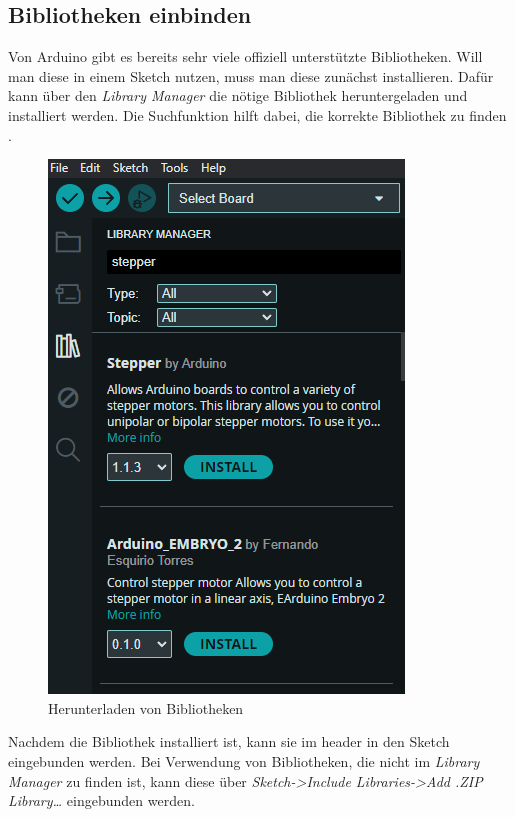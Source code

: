 \subsection{Bibliotheken einbinden}
Von Arduino gibt es bereits sehr viele offiziell unterstützte Bibliotheken. Will man diese in einem Sketch nutzen, muss man diese zunächst installieren.
Dafür kann über den \textit{Library Manager} die nötige Bibliothek heruntergeladen und installiert werden. Die Suchfunktion hilft dabei, die korrekte Bibliothek zu finden \cite{ArdIDE.2024c}.
\begin{figure}
	\begin{center}
		\includegraphics[width=\textwidth]{General/Librarymanager}
		\caption{Herunterladen von Bibliotheken} \label{Herunterladen von Bibliotheken}
	\end{center}
\end{figure}
Nachdem die Bibliothek installiert ist, kann sie im header in den Sketch eingebunden werden.
Bei Verwendung von Bibliotheken, die nicht im \textit{Library Manager} zu finden ist, kann diese über \textit{Sketch->Include Libraries->Add .ZIP Library…} eingebunden werden.

